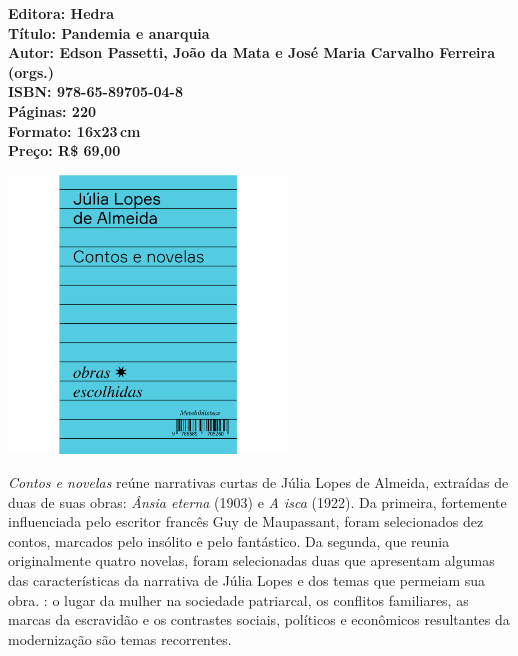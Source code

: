 \vfill
\noindent\begin{minipage}[c]{.5\linewidth}
{\small\textbf{
\hspace*{-.1cm}Editora: Hedra\\
Título: Pandemia e anarquia\\
Autor: Edson Passetti, João da Mata e José Maria Carvalho Ferreira (orgs.)\\ 
ISBN: 978-65-89705-04-8\\
Páginas: 220\\
Formato: 16x23\,cm\\
Preço: R\$ 69,00\\
}}
\end{minipage}
\pagebreak

\begin{center}
\hspace*{-3.6cm}
\hspace*{3.1cm}\includegraphics[width=74mm]{./CAPAS/HEDRA_JULIA.jpg}
\end{center}
\hspace*{-7cm}\hrulefill\hspace*{-7cm}
\medskip

\noindent{}\textit{Contos e novelas} reúne narrativas curtas de Júlia Lopes de Almeida, extraídas de duas de suas obras: \textit{Ânsia eterna} (1903) e \textit{A isca} (1922). Da primeira, fortemente influenciada pelo escritor francês Guy de Maupassant, foram selecionados dez contos, marcados pelo insólito e pelo fantástico. Da segunda, que reunia originalmente quatro novelas, foram selecionadas duas que apresentam algumas das características da narrativa de Júlia Lopes e dos temas que permeiam sua obra. : o lugar da mulher na sociedade patriarcal, os conflitos familiares, as marcas da escravidão e os contrastes sociais, políticos e econômicos resultantes da modernização são temas recorrentes.

